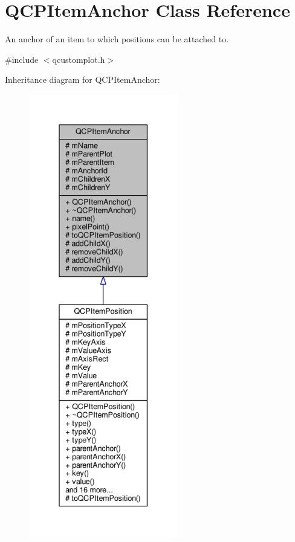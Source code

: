 \hypertarget{class_q_c_p_item_anchor}{}\section{Q\+C\+P\+Item\+Anchor Class Reference}
\label{class_q_c_p_item_anchor}


An anchor of an item to which positions can be attached to.  




{\ttfamily \#include $<$qcustomplot.\+h$>$}



Inheritance diagram for Q\+C\+P\+Item\+Anchor\+:\nopagebreak
\begin{figure}[H]
\begin{center}
\leavevmode
\includegraphics[height=550pt]{class_q_c_p_item_anchor__inherit__graph}
\end{center}
\end{figure}


